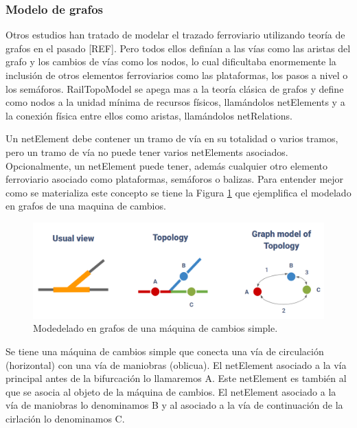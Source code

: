 \subsubsection{Modelo de grafos}

    Otros estudios han tratado de modelar el trazado ferroviario utilizando teoría de grafos en el pasado [REF]. Pero todos ellos definían a las vías como las aristas del grafo y los cambios de vías como los nodos, lo cual dificultaba enormemente la inclusión de otros elementos ferroviarios como las plataformas, los pasos a nivel o los semáforos. RailTopoModel se apega mas a la teoría clásica de grafos y define como nodos a la unidad mínima de recursos físicos, llamándolos netElements y a la conexión física entre ellos como aristas, llamándolos netRelations.

    Un netElement debe contener un tramo de vía en su totalidad o varios tramos, pero un tramo de vía no puede tener varios netElements asociados. Opcionalmente, un netElement puede tener, además cualquier otro elemento ferroviario asociado como plataformas, semáforos o balizas. Para entender mejor como se materializa este concepto se tiene la Figura \ref{fig:grafos_1} que ejemplifica el modelado en grafos de una maquina de cambios.

    \begin{figure}[!h]
        \centering
        \includegraphics[width=1\textwidth]{Figuras/grafos}
        \centering\caption{Modedelado en grafos de una máquina de cambios simple.}
        \label{fig:grafos_1}
    \end{figure}

    Se tiene una máquina de cambios simple que conecta una vía de circulación (horizontal) con una vía de maniobras (oblicua). El netElement asociado a la vía principal antes de la bifurcación lo llamaremos A. Este netElement es también al que se asocia al objeto de la máquina de cambios. El netElement asociado a la vía de maniobras lo denominamos B y al asociado a la vía de continuación de la cirlación lo denominamos C.

